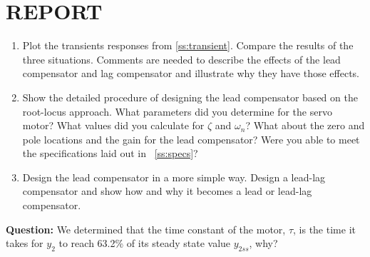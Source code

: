 \documentclass[11pt,a4paper]{article}
\begin{document}
\section{REPORT}
\begin{enumerate}
\item Plot the transients responses from \ref{ss:transient}. Compare the results of the three situations. Comments are needed to describe the effects of the lead compensator and lag compensator and illustrate why they have those effects.
\item Show the detailed procedure of designing the lead compensator based on the root-locus approach. What parameters did you determine for the servo motor? What values did you calculate for $\zeta$ and $\omega_{n}$? What about the zero and pole locations and the gain for the lead compensator? Were you able to meet the specifications laid out in ~\ref{ss:specs}?
\item Design the lead compensator in a more simple way. Design a lead-lag compensator and show how and why it becomes a lead or lead-lag compensator.
\end{enumerate}
\textbf{Question:} We determined that the time constant of the motor, $\tau$, is the time it takes for $y_{2}$ to reach 63.2\% of its steady state value $y_{2ss}$, why?
\end{document}
